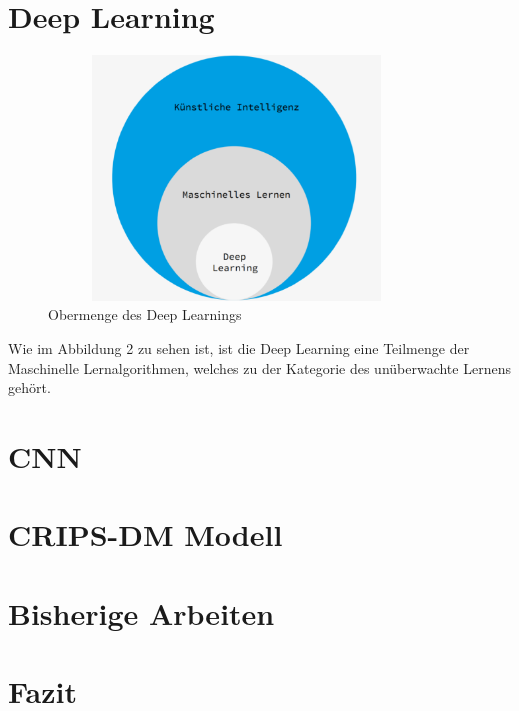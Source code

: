 \documentclass[12pt,titlepage]{article}
\begin{document}
\section{Deep Learning}

\begin{figure}[ht]
	\centering
  \includegraphics[width=10cm,height=6.5cm]{Abbildung_DeepLearning_1.png}
	\caption{Obermenge des Deep Learnings}
	\label{fig2}
\end{figure}

Wie im Abbildung 2 zu sehen ist, ist die Deep Learning eine Teilmenge der Maschinelle Lernalgorithmen, welches zu der Kategorie des unüberwachte Lernens gehört.\\

\section{CNN}

\section{CRIPS-DM Modell}

\section{Bisherige Arbeiten}

\section{Fazit}
\end{document}
